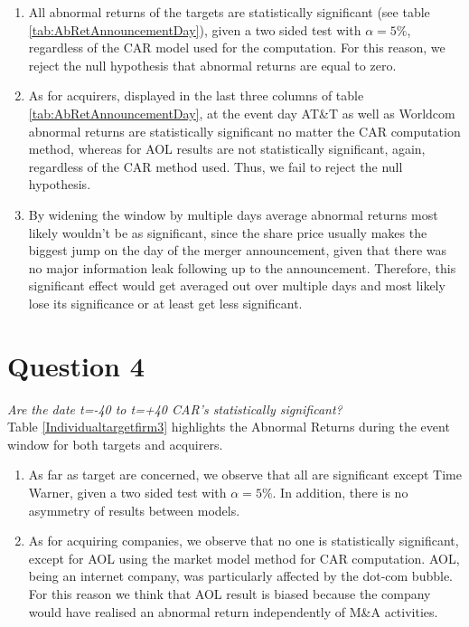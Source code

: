 \begin{enumerate}[label=\alph*),leftmargin=*]
    \item All abnormal returns of the targets are statistically significant (see table \ref{tab:AbRetAnnouncementDay}), given a two sided test with $\alpha=5\%$, regardless of the CAR model used for the computation. For this reason, we reject the null hypothesis that abnormal returns are equal to zero.
    \item As for acquirers, displayed in the last three columns of table \ref{tab:AbRetAnnouncementDay}, at the event day AT\&T as well as Worldcom abnormal returns are statistically significant no matter the CAR computation method, whereas for AOL results are not statistically significant, again, regardless of the CAR method used. Thus, we fail to reject the null hypothesis.
    \item By widening the window by multiple days average abnormal returns most likely wouldn’t be as significant, since the share price usually makes the biggest jump on the day of the merger announcement, given that there was no major information leak following up to the announcement. Therefore, this significant effect would get averaged out over multiple days and most likely lose its significance or at least get less significant.
\end{enumerate}

\section{Question 4}
\textit{Are the date t=-40 to t=+40 CAR’s statistically significant?}\\
Table \ref{Individualtargetfirm3} highlights the Abnormal Returns during the event window for both targets and acquirers.
\begin{enumerate}[label=\alph*),leftmargin=*]
    \item As far as target are concerned, we observe that all are significant except Time Warner, given a two sided test with $\alpha=5\%$. In addition, there is no asymmetry of results between models.
    \item As for acquiring companies, we observe that no one is statistically significant, except for AOL using the market model method for CAR computation. AOL, being an internet company, was particularly affected by the dot-com bubble. For this reason we think that AOL result is biased because the company would have realised an abnormal return independently of M\&A activities.
\end{enumerate}

